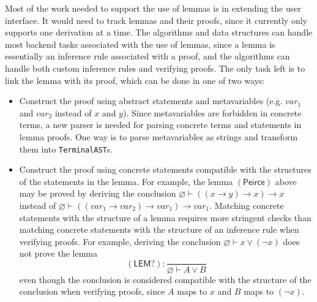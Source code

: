 Most of the work needed to support the use of lemmas is in extending the user interface. It would need to track lemmas and their proofs, since it currently only supports one derivation at a time. The algorithms and data structures can handle most backend tasks associated with the use of lemmas, since a lemma is essentially an inference rule associated with a proof, and the algorithms can handle both custom inference rules and verifying proofs. The only task left is to link the lemma with its proof, which can be done in one of two ways:
\begin{itemize}
    \item Construct the proof using abstract statements and metavariables (e.g. $var_1$ and $var_2$ instead of $x$ and $y$). Since metavariables are forbidden in concrete terms, a new parser is needed for parsing concrete terms and statements in lemma proofs. One way is to parse metavariables as strings and transform them into \lstinline{TerminalAST}s.
    \item Construct the proof using concrete statements compatible with the structures of the statements in the lemma. For example, the lemma $(\textsf{Peirce})$ above may be proved by deriving the conclusion $\varnothing \vdash ((x \to y) \to x) \to x$ instead of $\varnothing \vdash ((var_1 \to var_2) \to var_1) \to var_1$. Matching concrete statements with the structure of a lemma requires more stringent checks than matching concrete statements with the structure of an inference rule when verifying proofs. For example, deriving the conclusion $\varnothing \vdash x \lor (\lnot x)$ does not prove the lemma
    \[
        (\textsf{LEM?}): \frac{}{\varnothing \vdash A \lor B}
    \]
    even though the conclusion is considered compatible with the structure of the conclusion when verifying proofs, since $A$ maps to $x$ and $B$ maps to $(\lnot x)$.
\end{itemize}
